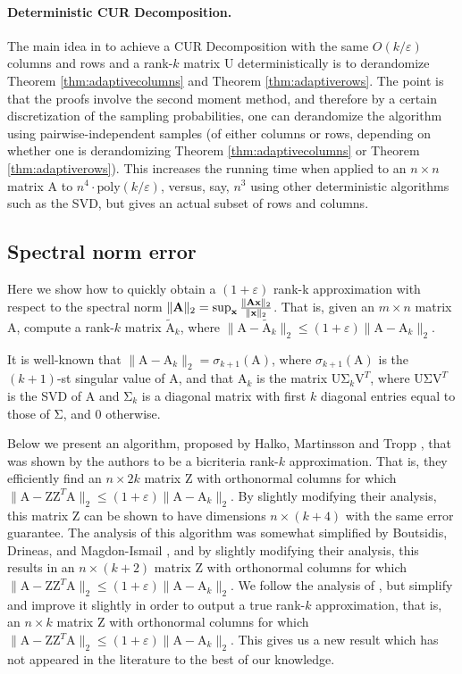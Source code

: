 \documentclass[11pt]{article}
\newcommand{\mat}[1]{{\ensuremath{\bm{\mathrm{#1}}}}}
\def\matA{\mat{A}}
\def\matU{\mat{U}}
\def\matV{\mat{V}}
\def\matZ{\mat{Z}}
\def\frac#1#2{{#1\over #2}}
\def\x{{\mathbf x}}
\newcommand{\eps}{\varepsilon}
\newcommand{\poly}{{\mathrm{poly}}}
\begin{document}
\paragraph{Deterministic CUR Decomposition.}
The main idea in \cite{BW14} 
to achieve a CUR Decomposition with the same $O(k/\eps)$ columns and rows and a rank-$k$ matrix $\matU$
deterministically is to derandomize Theorem \ref{thm:adaptivecolumns} and Theorem \ref{thm:adaptiverows}. The 
point is that the proofs involve the second moment method, and therefore by a certain discretization
of the sampling probabilities, one can derandomize the algorithm using pairwise-independent samples (of either columns
or rows, depending on whether one is derandomizing Theorem \ref{thm:adaptivecolumns} or Theorem \ref{thm:adaptiverows}). This
increases the running time when applied to an $n \times n$ matrix $\matA$ to $n^4 \cdot \poly(k/\eps)$, 
versus, say, $n^3$ using
other deterministic algorithms such as the SVD, but gives an actual subset of rows and columns. 

\subsection{Spectral norm error}\label{sec:spectral}
Here we show how to quickly obtain a $(1+\eps)$ rank-k approximation with respect to the spectral norm
$\|\matA\|_2 = \sup_{\x} \frac{\|\matA\x\|_2}{\|\x\|_2}$. That is, given an $m \times n$ matrix $\matA$, compute a rank-$k$
matrix $\tilde{\matA}_k$, where $\|\matA-\tilde{\matA}_k\|_2 \leq (1+\eps) \|\matA-\matA_k\|_2$. 

It is well-known that $\|\matA-\matA_k\|_2 = \sigma_{k+1}(\matA)$, where $\sigma_{k+1}(\matA)$ is the $(k+1)$-st singular
value of $\matA$, 
and that $\matA_k$ is the matrix $\matU \mat\Sigma_k \matV^T$, where $\matU \mat\Sigma \matV^T$ is the SVD of $\matA$ and
$\mat\Sigma_k$ is a diagonal matrix with first $k$ diagonal entries equal to those of $\mat\Sigma$, and $0$ otherwise. 

Below we present an algorithm, proposed by Halko, Martinsson and Tropp \cite{HMT}, that was shown 
by the authors to be a bicriteria
rank-$k$ approximation. That is, they efficiently find an $n \times 2k$ matrix $\matZ$ with orthonormal columns for which
 $\|\matA-\matZ\matZ^T\matA\|_2 \leq (1+\eps)\|\matA-\matA_k\|_2$. By slightly modifying their analysis, 
this matrix $\matZ$ can be shown to have dimensions $n \times (k+4)$ with the same error 
guarantee. 
The analysis of this algorithm was somewhat simplified by
Boutsidis, Drineas, and Magdon-Ismail \cite{BDM11a}, and by slightly modifying their analysis, this results in an 
$n \times (k+2)$ matrix $\matZ$ with orthonormal
columns for which $\|\matA-\matZ\matZ^T\matA\|_2 \leq (1+\eps)\|\matA-\matA_k\|_2$. 
We follow the analysis of \cite{BDM11a}, but 
simplify and improve it slightly in order to output 
a true rank-$k$ approximation, that is, an $n \times k$ matrix $\matZ$ with orthonormal columns for which 
$\|\matA-\matZ\matZ^T\matA\|_2 \leq (1+\eps)\|\matA-\matA_k\|_2$. This gives us a new result
which has not appeared in the literature to the best of our knowledge. 
\end{document}
